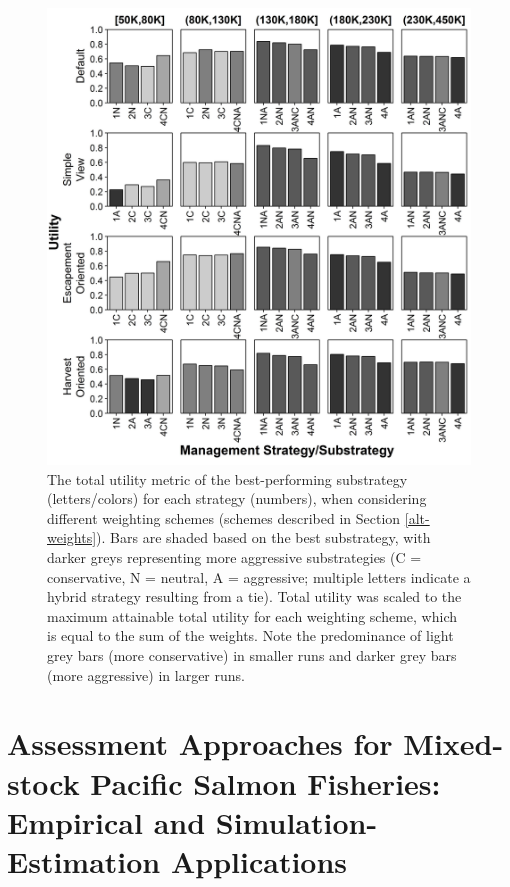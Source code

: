 \documentclass[12pt,]{book}
\theoremstyle{definition}
\theoremstyle{definition}
\theoremstyle{definition}
\theoremstyle{remark}
\begin{document}
\begin{singlespace}
\begin{figure}
  \centering
  \includegraphics{img/Ch3/btwn-ms-weights.jpg}
  \caption{The total utility metric of the best-performing substrategy (letters/colors) for each strategy (numbers), when considering different weighting schemes (schemes described in Section \ref{alt-weights}). Bars are shaded based on the best substrategy, with darker greys representing more aggressive substrategies (C = conservative, N = neutral, A = aggressive; multiple letters indicate a hybrid strategy resulting from a tie). Total utility was scaled to the maximum attainable total utility for each weighting scheme, which is equal to the sum of the weights. Note the predominance of light grey bars (more conservative) in smaller runs and darker grey bars (more aggressive) in larger runs.}
  \label{fig:btwn-ms-weights}
\end{figure}

\end{singlespace}

\chapter{Assessment Approaches for Mixed-stock Pacific Salmon Fisheries:
Empirical and Simulation-Estimation Applications}\label{ch4}
\end{document}
